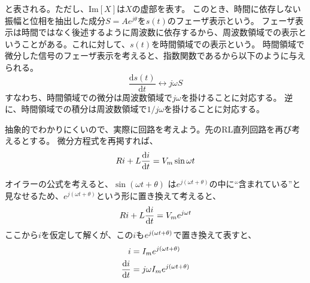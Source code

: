 \documentclass{ltjsreport}
\newcommand{\dft}[1]{\frac{\mathrm{d}#1}{\mathrm{d}t}}
\begin{document}
と表される。ただし、$\mathrm{Im}[X]$は$X$の虚部を表す。
このとき、時間に依存しない振幅と位相を抽出した成分$S = Ae^{j\theta}$を$s(t)$のフェーザ表示という。
フェーザ表示は時間ではなく後述するように周波数に依存するから、周波数領域での表示ということがある。これに対して、$s(t)$を時間領域での表示という。
時間領域で微分した信号のフェーザ表示を考えると、指数関数であるから以下のように与えられる。
\[
  \dft{s(t)} \leftrightarrow j\omega S
\]
すなわち、時間領域での微分は周波数領域で$j\omega$を掛けることに対応する。
逆に、時間領域での積分は周波数領域で$1/j\omega$を掛けることに対応する。

抽象的でわかりにくいので、実際に回路を考えよう。先のRL直列回路を再び考えるとする。
微分方程式を再掲すれば、
\[
  Ri +L \dft{i} = \vsin
\]

オイラーの公式を考えると、$\sin(\omega t + \theta)$ は$e^{j(\omega t+\theta)}$の中に``含まれている''と見なせるため、$e^{j(\omega t+\theta)}$という形に置き換えて考えると、
\[
  Ri + L \dft{i} = V_m \e{\omega t}
\]
ここから$i$を仮定して解くが、この$i$も$e^{j (\omega t + \theta)}$で置き換えて表すと、
\begin{align}
  i &= I_m \ejwtth \\
  \dft{i} &= j\omega I_m \ejwtth
\end{align}
\end{document}

